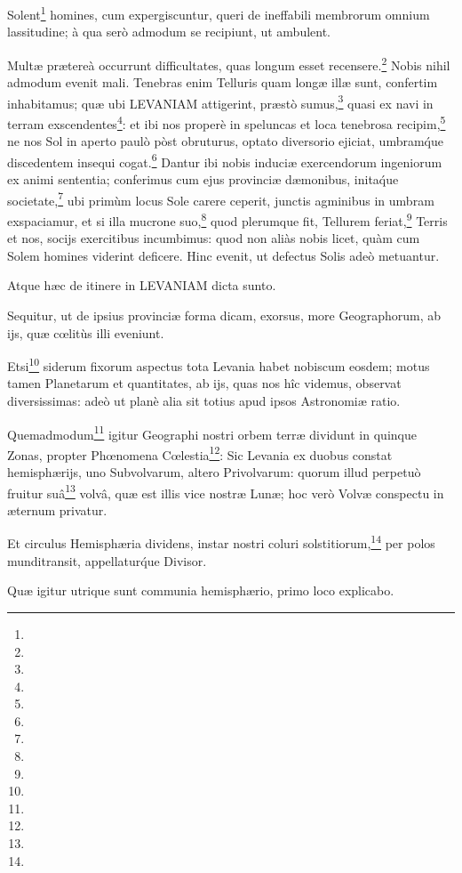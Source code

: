 \documentclass[a4paper, 11pt, oneside, polutonikogreek, german]{article}
\begin{document}
Solent\footnote{} homines, cum expergiscuntur, queri de ineffabili membrorum omnium lassitudine; à qua serò admodum se recipiunt, ut ambulent.

Multæ prætereà occurrunt difficultates, quas longum esset recensere.\footnote{} Nobis nihil admodum evenit mali. Tenebras enim Telluris quam longæ illæ sunt, confertim inhabitamus; quæ ubi LEVANIAM attigerint, præstò sumus,\footnote{} quasi ex navi in terram exscendentes\footnote{}: et ibi nos properè in speluncas et loca tenebrosa recipim,\footnote{} ne nos Sol in aperto paulò pòst obruturus, optato diversorio ejiciat, umbram\'que discedentem insequi cogat.\footnote{} Dantur ibi nobis induciæ exercendorum ingeniorum ex animi sententia; conferimus cum ejus provinciæ dæmonibus, inita\'que societate,\footnote{} ubi primùm locus Sole carere ceperit, junctis agminibus in umbram exspaciamur, et si illa mucrone suo,\footnote{} quod plerumque fit, Tellurem feriat,\footnote{} Terris et nos, socijs exercitibus incumbimus: quod non aliàs nobis licet, quàm cum Solem homines viderint deficere. Hinc evenit, ut defectus Solis adeò metuantur.

Atque hæc de itinere in LEVANIAM dicta sunto.

Sequitur, ut de ipsius provinciæ forma dicam, exorsus, more Geographorum, ab ijs, quæ cœlitùs illi eveniunt.

Etsi\footnote{} siderum fixorum aspectus tota Levania habet nobiscum eosdem; motus tamen Planetarum et quantitates, ab ijs, quas nos hîc videmus, observat diversissimas: adeò ut planè alia sit totius apud ipsos Astronomiæ ratio.

Quemadmodum\footnote{} igitur Geographi nostri orbem terræ dividunt in quinque Zonas, propter Phœnomena Cœlestia\footnote{}: Sic Levania ex duobus constat hemisphærijs, uno Subvolvarum, altero Privolvarum: quorum illud perpetuò fruitur suâ\footnote{} volvâ, quæ est illis vice nostræ Lunæ; hoc verò Volvæ conspectu in æternum privatur.

Et circulus Hemisphæria dividens, instar nostri coluri solstitiorum,\footnote{} per polos munditransit, appellatur\'que Divisor.

Quæ igitur utrique sunt communia hemisphærio, primo loco explicabo.
\end{document}
